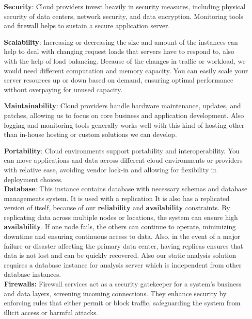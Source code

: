 \indent \textbf{Security}: Cloud providers invest heavily in security measures, including physical security of data centers, network security, and data encryption. Monitoring tools and firewall helps to sustain a secure application server.

\indent \textbf{Scalability}: Increasing or decreasing the size and amount of the instances can help to deal with changing request loads that servers have to respond to, also with the help of load balancing. Because of the changes in traffic or workload, we would need different computation and memory capacity. You can easily scale your server resources up or down based on demand, ensuring optimal performance without overpaying for unused capacity.

\indent \textbf{Maintainability}: Cloud providers handle hardware maintenance, updates, and patches, allowing us to focus on core business and application development. Also logging and monitoring tools generally works well with this kind of hosting other than in-house hosting or custom solutions we can develop.

\indent \textbf{Portability}: Cloud environments support portability and interoperability. You can move applications and data across different cloud environments or providers with relative ease, avoiding vendor lock-in and allowing for flexibility in deployment choices.
\\
\indent \textbf{Database}: This instance contains database with necessary schemas and database managements system. It is used with a replication It is also has a replicated version of itself, because of our \textbf{reliability} and \textbf{availability} constraints. By replicating data across multiple nodes or locations, the system can ensure high \textbf{availability}. If one node fails, the others can continue to operate, minimizing downtime and ensuring continuous access to data. Also, in the event of a major failure or disaster affecting the primary data center, having replicas ensures that data is not lost and can be quickly recovered. Also our static analysis solution requires a database instance for analysis server which is independent from other database instances.
\\
\indent \textbf{Firewalls:} Firewall services act as a security gatekeeper for a system's business and data layers, screening incoming connections. They enhance security by enforcing rules that either permit or block traffic, safeguarding the system from illicit access or harmful attacks.

